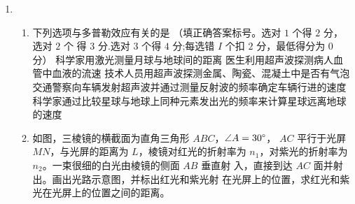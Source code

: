 \begin{enumerate}
\item 
{}
\begin{enumerate}
	\item
下列选项与多普勒效应有关的是
 \underlinegap 
（填正确答案标号。选对 $ 1 $ 个得 $ 2 $ 分，选对 $ 2 $ 个
得 $ 3 $ 分.选对 $ 3 $ 个得 $ 4 $ 分;每选错 $ I $ 个扣 $ 2 $ 分，最低得分为 $ 0 $ 分）
\fivechoices
{科学家用激光测量月球与地球间的距离}
{医生利用超声波探测病人血管中血液的流速}
{技术人员用超声波探测金属、陶瓷、混凝土中是否有气泡}
{交通警察向车辆发射超声波并通过测量反射波的频率确定车辆行进的速度}
{科学家通过比较星球与地球上同种元素发出光的频率来计算星球远离地球的速度}




\item 
如图，三棱镜的横截面为直角三角形 $ ABC $，$ \angle A=30 \degree  $，
$ AC $ 平行于光屏 $ MN $，与光屏的距离为 $ L $，棱镜对红光的折射率为
$ n_{1} $，对紫光的折射率为 $ n_{2} $。一束很细的白光由棱镜的侧面 $ AB $ 垂直射
入，直接到达 $ AC $ 面并射出。画出光路示意图，并标出红光和紫光射
在光屏上的位置，求红光和紫光在光屏上的位置之间的距离。
\begin{figure}[h!]
	\flushright
	
\end{figure}




\end{enumerate}



\end{enumerate}
